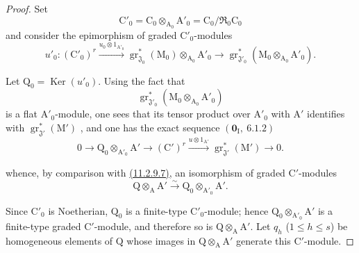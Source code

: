 \begin{proof}
Set
\[
  \mathrm{C}'_0=\mathrm{C}_0\otimes_{\mathrm{A}_0}\mathrm{A}'_0
  =\mathrm{C}_0/\mathfrak{R}_0\mathrm{C}_0
\]
and consider the epimorphism of graded $\mathrm{C}'_0$-modules
\[
  u'_0:(\mathrm{C}'_0)^r
  \xrightarrow{u_0\otimes 1_{\mathrm{A}'_0}}
  \operatorname{gr}^*_{\mathfrak{J}_0}(\mathrm{M}_0)\otimes_{\mathrm{A}_0}\mathrm{A}'_0
  \longrightarrow
  \operatorname{gr}^*_{\mathfrak{J}'_0}
  (\mathrm{M}_0\otimes_{\mathrm{A}_0}\mathrm{A}'_0).
\]

Let $\mathrm{Q}_0=\operatorname{Ker}(u'_0)$. Using the fact that
\[
  \operatorname{gr}^*_{\mathfrak{J}'_0}
  (\mathrm{M}_0\otimes_{\mathrm{A}_0}\mathrm{A}'_0)
\]
is a flat $\mathrm{A}'_0$-module, one sees that its tensor product over $\mathrm{A}'_0$ with $\mathrm{A}'$ identifies with $\operatorname{gr}^*_{\mathfrak{J}'}(\mathrm{M}')$ , and one has the exact sequence $(\mathbf{0}_\mathrm{I},~6.1.2)$
\begin{equation}
  0\longrightarrow\mathrm{Q}_0\otimes_{\mathrm{A}'_0}\mathrm{A}'
  \longrightarrow(\mathrm{C}')^r
  \xrightarrow{u\otimes 1_{\mathrm{A}'}}
  \operatorname{gr}^*_{\mathfrak{J}'}(\mathrm{M}')
  \longrightarrow 0.
  \tag{11.2.9.8}
\end{equation}


whence, by comparison with \hyperref[IV.11.2.9]{(11.2.9.7)}, an isomorphism of graded $\mathrm{C}'$-modules
\[
  \mathrm{Q}\otimes_\mathrm{A}\mathrm{A}'
  \xrightarrow{\sim}
  \mathrm{Q}_0\otimes_{\mathrm{A}'_0}\mathrm{A}'.
\]

Since $\mathrm{C}'_0$ is Noetherian, $\mathrm{Q}_0$ is a finite-type $\mathrm{C}'_0$-module; hence $\mathrm{Q}_0\otimes_{\mathrm{A}'_0}\mathrm{A}'$ is a finite-type graded $\mathrm{C}'$-module, and therefore so is $\mathrm{Q}\otimes_\mathrm{A}\mathrm{A}'$. Let $q_h$ ($1\leqslant h\leqslant s$) be homogeneous elements of $\mathrm{Q}$ whose images in $\mathrm{Q}\otimes_\mathrm{A}\mathrm{A}'$ generate this $\mathrm{C}'$-module.


\end{proof}
